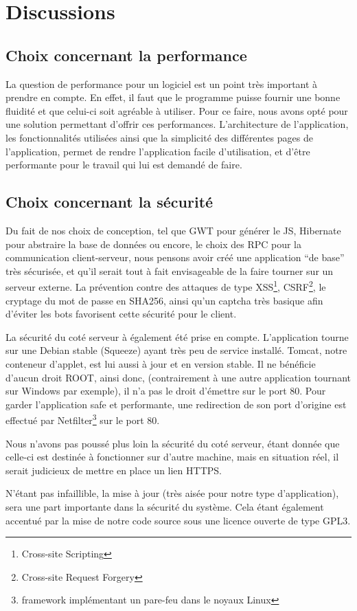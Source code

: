 \chapter{Discussions}
\section{Choix concernant la performance}
La question de performance pour un logiciel est un point très important à prendre en compte. En effet, il faut que le programme puisse fournir une bonne fluidité et que celui-ci soit agréable à utiliser. Pour ce faire, nous avons opté pour une solution permettant d'offrir ces performances. L'architecture de l'application, les fonctionnalités utilisées ainsi que la simplicité des différentes pages de l'application, permet de rendre l'application facile d'utilisation, et d'être performante pour le travail qui lui est demandé de faire.
\section{Choix concernant la sécurité}


Du fait de nos choix de conception, tel que GWT pour générer le JS, Hibernate pour abstraire la base de données ou encore, le choix des RPC pour la
communication client-serveur, nous pensons avoir créé une application \enquote{de base} très sécurisée, et qu'il serait tout à fait envisageable de la faire tourner sur un serveur externe.
La prévention contre des attaques de type XSS\footnote{Cross-site Scripting}, CSRF\footnote{Cross-site Request Forgery}, le cryptage du mot de passe en SHA256, ainsi qu'un captcha très basique afin d'éviter les bots favorisent cette sécurité pour le client.


La sécurité du coté serveur à également été prise en compte. L'application tourne sur une Debian stable (Squeeze) ayant très peu de service installé. Tomcat, notre conteneur d'applet, est lui aussi à jour et en version stable. Il ne bénéficie d'aucun droit ROOT, ainsi donc, (contrairement à une autre application tournant sur Windows par exemple), il n'a pas le droit d'émettre sur le port 80. Pour garder l'application safe et performante, une redirection de son port d'origine est effectué par Netfilter\footnote{framework implémentant un pare-feu dans le noyaux Linux} sur le port 80.

Nous n'avons pas poussé plus loin la sécurité du coté serveur, étant donnée que celle-ci est destinée à fonctionner sur d'autre machine, mais en situation réel, il serait judicieux de mettre en place un lien HTTPS.

N'étant pas infaillible, la mise à jour (très aisée pour notre type d'application), sera une part importante dans la sécurité du système. Cela étant également accentué par la mise de notre code source sous une licence ouverte de type GPL3.
